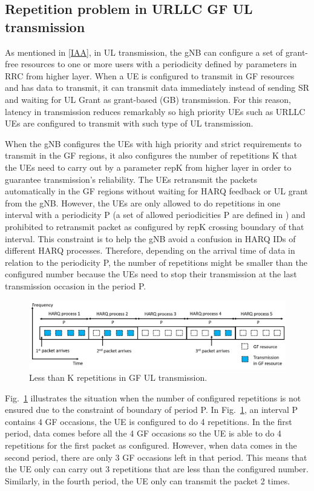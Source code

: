 \documentclass[conference]{IEEEtran}
\begin{document}
\subsection{Repetition problem in URLLC GF UL transmission}\label{IBB}
As mentioned in \ref{IAA}, in UL transmission, the gNB can configure a set of grant-free resources to one or more users with a periodicity defined by parameters in RRC from higher layer. When a UE is configured to transmit in GF resources and has data to transmit, it can transmit data immediately instead of sending SR and waiting for UL Grant as grant-based (GB) transmission. For this reason, latency in transmission reduces remarkably so high priority UEs such as URLLC UEs are configured to transmit with such type of UL transmission.

When the gNB configures the UEs with high priority and strict requirements to transmit in the GF regions, it also configures the number of repetitions K that the UEs need to carry out by a parameter repK from higher layer in order to guarantee transmission’s reliability. The UEs retransmit the packets automatically in the GF regions without waiting for HARQ feedback or UL grant from the gNB. However, the UEs are only allowed to do repetitions in one interval with a periodicity P (a set of allowed periodicities P are defined in \cite{ad5}) and prohibited to retransmit packet as configured by repK crossing boundary of that interval. This constraint is to help the gNB avoid a confusion in HARQ IDs of different HARQ processes. Therefore, depending on the arrival time of data in relation to the periodicity P, the number of repetitions might be smaller than the configured number because the UEs need to stop their transmission at the last transmission occasion in the period P.

\begin{figure}[htbp]
\centerline{\includegraphics[scale=0.27]{fig1.png}}
\caption{Less than K repetitions in GF UL transmission.}
\label{fig1}
\end{figure}

Fig.~\ref{fig1} illustrates the situation when the number of configured repetitions is not ensured due to the constraint of boundary of period P. In Fig.~\ref{fig1}, an interval P contains 4 GF occasions, the UE is configured to do 4 repetitions. In the first period, data comes before all the 4 GF occasions so the UE is able to do 4 repetitions for the first packet as configured. However, when data comes in the second period, there are only 3 GF occasions left in that period. This means that the UE only can carry out 3 repetitions that are less than the configured number. Similarly, in the fourth period, the UE only can transmit the packet 2 times.
\end{document}
